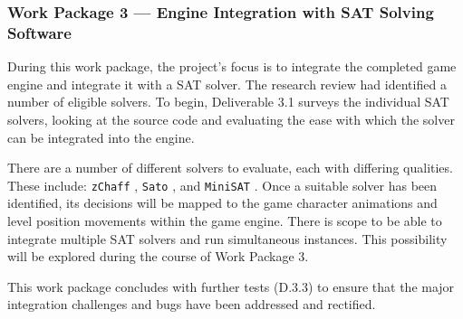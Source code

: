 \documentclass[a4paper]{article}
\begin{document}








\subsubsection{Work Package 3 --- Engine Integration with SAT Solving Software}

During this work package, the project's focus is to integrate the completed game engine and
integrate it with a SAT solver. The research review had identified a number of eligible solvers. To
begin, Deliverable 3.1 surveys the individual SAT solvers, looking at the source code and
evaluating the ease with which the solver can be integrated into the engine. 

There are a number of different solvers to evaluate, each with differing qualities. These include:
\texttt{zChaff} \cite{fu2004zchaff}, \texttt{Sato} \cite{zhang1997sato}, and \texttt{MiniSAT}
\cite{sorensson2005minisat}. Once a suitable solver has been identified, its decisions will be mapped
to the game character animations and level position movements within the game engine. There is scope
to be able to integrate multiple SAT solvers and run simultaneous instances. This possibility will
be explored during the course of Work Package 3.

This work package concludes with further tests (D.3.3) to ensure that the
major integration challenges and bugs have been addressed and rectified.

\end{document}
